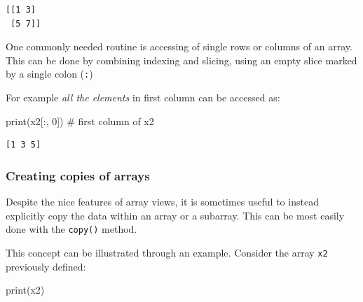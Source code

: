 \documentclass[
  letterpaper,
  DIV=11,
  numbers=noendperiod]{scrreprt}
\newenvironment{Shaded}{\begin{snugshade}}{\end{snugshade}}
\newcommand{\BuiltInTok}[1]{\textcolor[rgb]{0.00,0.23,0.31}{#1}}
\newcommand{\CommentTok}[1]{\textcolor[rgb]{0.37,0.37,0.37}{#1}}
\newcommand{\DecValTok}[1]{\textcolor[rgb]{0.68,0.00,0.00}{#1}}
\newcommand{\NormalTok}[1]{\textcolor[rgb]{0.00,0.23,0.31}{#1}}
\theoremstyle{plain}
\theoremstyle{definition}
\theoremstyle{remark}
\begin{document}
\begin{verbatim}
[[1 3]
 [5 7]]
\end{verbatim}

\begin{tcolorbox}[enhanced jigsaw, leftrule=.75mm, bottomtitle=1mm, colback=white, toptitle=1mm, opacitybacktitle=0.6, toprule=.15mm, colbacktitle=quarto-callout-note-color!10!white, arc=.35mm, colframe=quarto-callout-note-color-frame, title=\textcolor{quarto-callout-note-color}{\faInfo}\hspace{0.5em}{Accessing array rows and columns}, titlerule=0mm, rightrule=.15mm, left=2mm, bottomrule=.15mm, breakable, coltitle=black, opacityback=0]

One commonly needed routine is accessing of single rows or columns of an
array. This can be done by combining indexing and slicing, using an
empty slice marked by a single colon (\texttt{:})

\end{tcolorbox}

For example \emph{all the elements} in first column can be accessed as:

\begin{Shaded}
\begin{Highlighting}[]
\BuiltInTok{print}\NormalTok{(x2[:, }\DecValTok{0}\NormalTok{])  }\CommentTok{\# first column of x2}
\end{Highlighting}
\end{Shaded}

\begin{verbatim}
[1 3 5]
\end{verbatim}

\subsubsection{Creating copies of
arrays}\label{creating-copies-of-arrays}

Despite the nice features of array views, it is sometimes useful to
instead explicitly copy the data within an array or a subarray. This can
be most easily done with the \texttt{copy()} method.

This concept can be illustrated through an example. Consider the array
\texttt{x2} previously defined:

\begin{Shaded}
\begin{Highlighting}[]
\BuiltInTok{print}\NormalTok{(x2)}
\end{Highlighting}
\end{Shaded}
\end{document}
